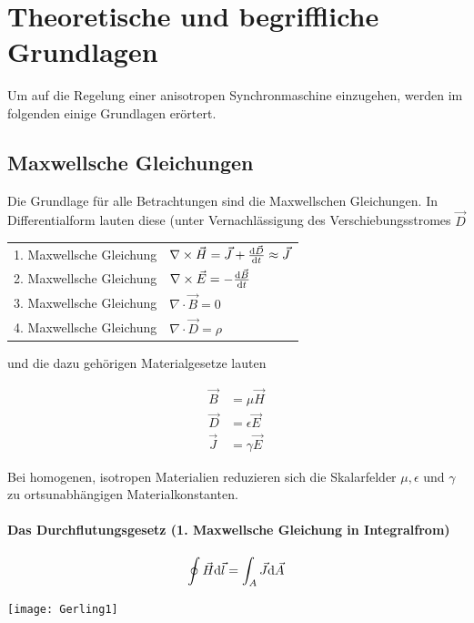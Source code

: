 
\chapter{Theoretische und begriffliche Grundlagen}\label{cha:grundlagen}

Um auf die Regelung einer anisotropen Synchronmaschine einzugehen, werden im folgenden einige Grundlagen erörtert.

\section{Maxwellsche Gleichungen}\label{sec:maxwell}

Die Grundlage für alle Betrachtungen sind die Maxwellschen Gleichungen.
In Differentialform lauten diese (unter Vernachlässigung des Verschiebungsstromes $\vec{D}$

\begin{tabular}{ll}
1. Maxwellsche Gleichung	&	$\nabla \times \vec{H} = \vec{J}+\frac{\mathrm{d}\vec{D}}{\mathrm{d}t} \approx \vec{J}$ \\
2. Maxwellsche Gleichung	&	$\nabla \times \vec{E} = -\frac{\mathrm{d}\vec{B}}{\mathrm{d}t}$ \\
3. Maxwellsche Gleichung	&	$\nabla \cdot \vec{B} = 0$ \\
4. Maxwellsche Gleichung	&	$\nabla \cdot \vec{D} = \rho$
\end{tabular}

und die dazu gehörigen Materialgesetze lauten

\begin{align*}
\vec{B} &= \mu\vec{H}\\
\vec{D}	&= \epsilon\vec{E}\\
\vec{J} &= \gamma\vec{E}
\end{align*}

Bei homogenen, isotropen Materialien reduzieren sich die Skalarfelder $\mu, \epsilon$ und $\gamma$ zu ortsunabhängigen Materialkonstanten.

\subsubsection{Das Durchflutungsgesetz (1. Maxwellsche Gleichung in Integralfrom)}

\begin{minipage}{0.5\textwidth}
	\begin{align}
		\oint \vec{H}\mathrm{d}\vec{l} = \int_A \vec{J}\mathrm{d}\vec{A}
	\end{align}
\end{minipage}
\begin{minipage}{0.5\textwidth}
	\texttt{[image: Gerling1]}
\end{minipage}


